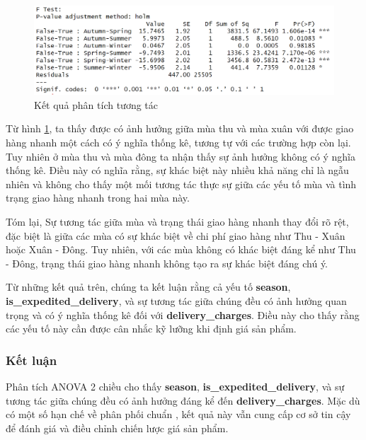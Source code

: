 \begin{figure}[!htbp]
    \centering
    \includegraphics[width=1\linewidth]{graphics/5.8.png}
    \caption{Kết quả phân tích tương tác}
    \label{fig:5.8}
\end{figure}
Từ hình \ref{fig:5.8}, ta thấy được có ảnh hưởng giữa mùa thu và mùa xuân với được giao hàng nhanh một cách có ý nghĩa thống kê,
tương tự với các trường hợp còn lại. 
Tuy nhiên ở mùa thu và mùa đông ta nhận thấy sự ảnh hưởng không có ý nghĩa thống kê. Điều này có nghĩa rằng, sự khác biệt này nhiều khả năng chỉ là ngẫu nhiên và không cho thấy một mối tương tác thực sự giữa các yếu tố mùa và tình trạng giao hàng nhanh trong hai mùa này.    

Tóm lại, Sự tương tác giữa mùa và trạng thái giao hàng nhanh thay đổi rõ rệt, đặc biệt là giữa các mùa có sự khác biệt về chi phí giao hàng như Thu - Xuân hoặc Xuân - Đông. Tuy nhiên, với các mùa không có khác biệt đáng kể như Thu - Đông, trạng thái giao hàng nhanh không tạo ra sự khác biệt đáng chú ý.

Từ những kết quả trên, chúng ta kết luận rằng cả yếu tố \textbf{season}, \textbf{is\_expedited\_delivery}, và sự tương tác giữa chúng đều có ảnh hưởng quan trọng và có ý nghĩa thống kê đối với \textbf{delivery\_charges}. Điều này cho thấy rằng các yếu tố này cần được cân nhắc kỹ lưỡng khi định giá sản phẩm.
              
\subsubsection{Kết luận}
Phân tích ANOVA 2 chiều cho thấy \textbf{season}, \textbf{is\_expedited\_delivery}, và sự tương tác giữa chúng đều có ảnh hưởng đáng kể đến \textbf{delivery\_charges}. Mặc dù có một số hạn chế về phân phối chuẩn , kết quả này vẫn cung cấp cơ sở tin cậy để đánh giá và điều chỉnh chiến lược giá sản phẩm.